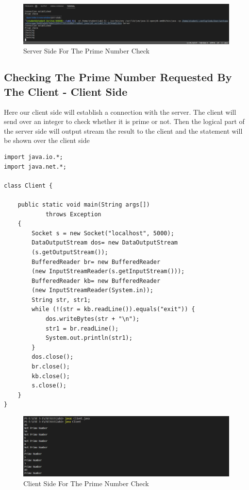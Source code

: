 \documentclass[11pt]{article}
\begin{document}
\begin{figure}[!h]
\centering
\includegraphics[width=\textwidth]{prime_server.png}
\caption{Server Side For The Prime Number Check}
\end{figure}
\newpage

\subsection{Checking The Prime Number Requested By The Client - Client Side}
Here our client side will establish a connection with the server. The client will send over an integer to check whether it is prime or not.  Then the logical part of the server side will output stream the result to the client and the statement will be shown over the client side


\begin{verbatim}
import java.io.*;
import java.net.*;

class Client {

    public static void main(String args[])
            throws Exception
    {
        Socket s = new Socket("localhost", 5000);
        DataOutputStream dos= new DataOutputStream
        (s.getOutputStream());
        BufferedReader br= new BufferedReader
        (new InputStreamReader(s.getInputStream()));
        BufferedReader kb= new BufferedReader
        (new InputStreamReader(System.in));
        String str, str1;
        while (!(str = kb.readLine()).equals("exit")) {
            dos.writeBytes(str + "\n");
            str1 = br.readLine();
            System.out.println(str1);
        }
        dos.close();
        br.close();
        kb.close();
        s.close();
    }
}
\end{verbatim}

\begin{figure}[!h]
\centering
\includegraphics[width=\textwidth]{prime_client.png}
\caption{Client Side For The Prime Number Check}
\end{figure}
\newpage
\end{document}
